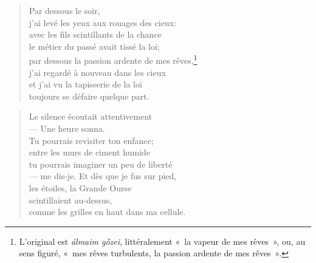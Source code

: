 \newpage


\vspace*{-15mm}
\centeredornament




\begin{verse}
  Par dessous le soir, \\
  j'ai levé les yeux aux rouages des cieux: \\
  avec les fils scintillants de la chance \\
  le métier du passé avait tissé la loi; \\
  par dessous la passion ardente de mes rêves,\footnote{L'original est
  \emph{álmaim gőzei}, littéralement «~la vapeur de mes rêves~», ou,
  au sens figuré, «~mes rêves turbulents, la passion ardente de mes
  rêves~».} \\
  j'ai regardé à nouveau dans les cieux \\
  et j'ai vu la tapisserie de la loi \\
  toujours se défaire quelque part.
\end{verse}

\bigskip



\begin{verse}
  Le silence écoutait attentivement \\
  --- Une heure sonna. \\
  Tu pourrais revisiter ton enfance; \\
  entre les murs de ciment humide \\
  tu pourrais imaginer un peu de liberté \\
  --- me dis-je. Et dès que je fus sur pied, \\
  les étoiles, la Grande Ourse \\
  scintillaient au-dessus, \\
  comme les grilles en haut dans ma cellule.
\end{verse}

\newpage

